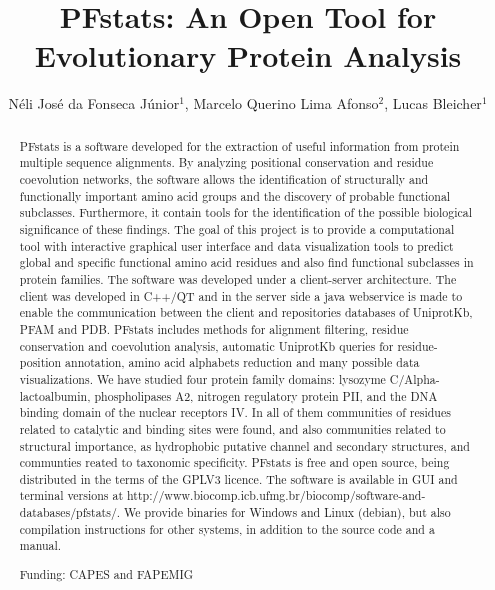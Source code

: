 \documentclass[twoside]{article}
\title{\vspace{-15mm}\fontsize{24pt}{10pt}\selectfont\textbf{PFstats: An Open Tool for Evolutionary Protein Analysis}} %
\author{N\'eli Jos\'e da Fonseca J\'unior$^1$, Marcelo Querino Lima Afonso$^2$, Lucas Bleicher$^1$}
\affil{1 UFMG\\ }
\date{}
\begin{document}
\maketitle %

\thispagestyle{fancy} %


\begin{abstract}
PFstats is a software developed for the extraction of useful information from protein multiple sequence alignments. By analyzing positional conservation and residue coevolution networks, the software allows the identification of structurally and functionally important amino acid groups and the discovery of probable functional subclasses. Furthermore, it contain tools for the identification of the possible biological significance of these findings. The goal of this project is to provide a computational tool with interactive graphical user interface and data visualization tools to predict global and specific functional amino acid residues and also find functional subclasses in protein families. The software was developed under a client-server architecture. The client was developed in C++/QT and in the server side a java webservice is made to enable the communication between the client and repositories databases of UniprotKb, PFAM and PDB. PFstats includes methods for alignment filtering, residue conservation and coevolution analysis, automatic UniprotKb queries for residue-position annotation, amino acid alphabets reduction and many possible data visualizations. We have studied four protein family domains: lysozyme C/Alpha-lactoalbumin, phospholipases A2, nitrogen regulatory protein PII, and the DNA binding domain of the nuclear receptors IV. In all of them communities of residues related to catalytic and binding sites were found, and also communities related to structural importance, as hydrophobic putative channel and secondary structures, and communties reated to taxonomic specificity. PFstats is free and open source, being distributed in the terms of the GPLV3 licence. The software is available in GUI and terminal versions at http://www.biocomp.icb.ufmg.br/biocomp/software-and-databases/pfstats/. We provide binaries for Windows and Linux (debian), but also compilation instructions for other systems, in addition to the source code and a manual.

Funding: CAPES and FAPEMIG
\end{abstract}
\end{document}

